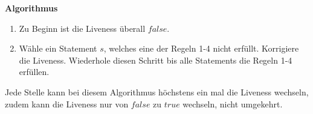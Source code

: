 \textbf{Algorithmus}

\begin{enumerate}
	\item Zu Beginn ist die Liveness überall $false$.
	\item Wähle ein Statement $s$, welches eine der Regeln 1-4 nicht erfüllt.
		Korrigiere die Liveness. Wiederhole diesen Schritt bis alle Statements die
		Regeln 1-4 erfüllen.
\end{enumerate}

Jede Stelle kann bei diesem Algorithmus höchstens ein mal die Liveness wechseln,
zudem kann die Liveness nur von $false$ zu $true$ wechseln, nicht umgekehrt.
